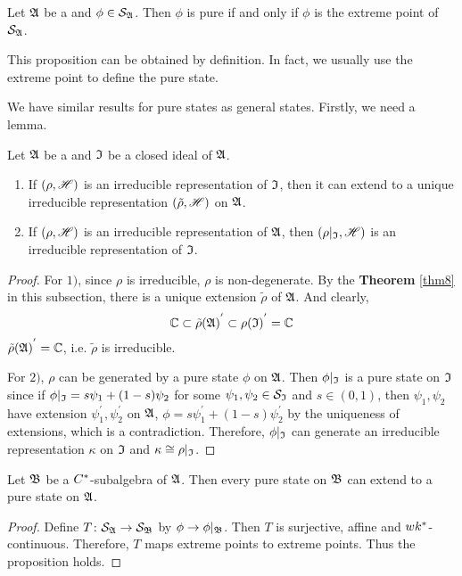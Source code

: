 \documentclass[a4paper,11pt]{report}
\begin{document}
\begin{prop}
	Let $\mathfrak{A}$ be a \Cs and $\phi \in \mathcal{S}_{\mathfrak{A}}$. Then $\phi$ is pure if and only if $\phi$ is the extreme point of  $\mathcal{S}_{\mathfrak{A}}$.
\end{prop}
\begin{rem}
	This proposition can be obtained by definition. In fact, we usually use the extreme point to define the pure state.
\end{rem}

We have similar results for pure states as general states. Firstly, we need a lemma.

\begin{prop}
	Let $\mathfrak{A}$ be a \Cs and $\mathfrak{I}$ be a closed ideal of $\mathfrak{A}$. 
	\begin{enumerate}[label=\arabic*)]
		\item If $(\rho, \mathscr{H})$ is an irreducible representation of $\mathfrak{I}$, then it can extend to a unique irreducible representation $(\tilde{\rho},\mathscr{H})$ on $\mathfrak{A}$.
		\item If $(\rho, \mathscr{H})$ is an irreducible representation of $\mathfrak{A}$, then $(\rho|_{\mathfrak{I}},\mathscr{H})$ is an irreducible representation of $\mathfrak{I}$.
	\end{enumerate}
\end{prop}
\begin{proof}
	For $1)$, since $\rho$ is irreducible, $\rho$ is non-degenerate. By the \textbf{Theorem} \ref{thm8} in this subsection, there is a unique extension $\tilde{\rho}$ of $\mathfrak{A}$. And clearly, 
	\begin{equation*}
		\mathbb{C} \subset {\tilde{\rho}(\mathfrak{A})}^{'} \subset {\rho(\mathfrak{I})}^{'} = \mathbb{C}
	\end{equation*} 
	${\tilde{\rho}(\mathfrak{A})}^{'} = \mathbb{C}$, i.e. $\tilde{\rho}$ is irreducible.
	\item For $2)$, $\rho$ can be generated by a pure state $\phi$ on $\mathfrak{A}$. Then $\phi|_{\mathfrak{I}}$ is a pure state on $\mathfrak{I}$ since if $\phi|_{\mathfrak{I}} = s\psi_1 + (1-s)\psi_2$ for some $\psi_1 ,\psi_2 \in \mathcal{S}_{\mathfrak{I}}$ and $s \in (0,1)$, then $\psi_1, \psi_2$ have extension $\psi_1^{'}, \psi_2^{'}$ on $\mathfrak{A}$, $\phi = s\psi_1^{'} + (1-s)\psi_2^{'}$ by the uniqueness of extensions, which is a contradiction. Therefore, $\phi|_{\mathfrak{I}}$ can generate an irreducible representation $\kappa$ on $\mathfrak{I}$ and $\kappa \cong \rho|_{\mathfrak{I}}$.
\end{proof}

\begin{prop}
	Let $\mathfrak{B}$ be a $C^{*}$-subalgebra of $\mathfrak{A}$. Then every pure state on $\mathfrak{B}$ can extend to a pure state on $\mathfrak{A}$.
\end{prop}
\begin{proof}
	Define $T \colon \mathcal{S}_{\mathfrak{A}} \rightarrow \mathcal{S}_{\mathfrak{B}}$ by $\phi \rightarrow \phi|_{\mathfrak{B}}$. Then $T$ is surjective, affine and $wk^{*}$-continuous. Therefore, $T$ maps extreme points to extreme points. Thus the proposition holds.
\end{proof}
\end{document}

